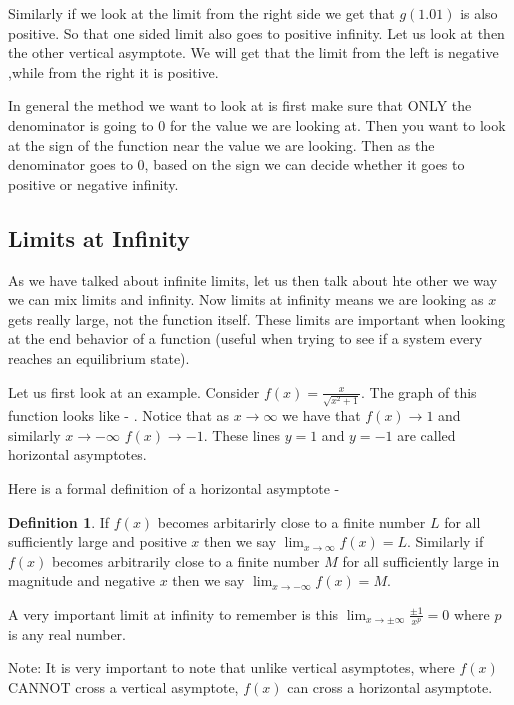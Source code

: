 \documentclass[12pt,reqno]{article}
\theoremstyle{definition}
\newtheorem*{Definition}{Definition}
\begin{document}
	Similarly if we look at the limit from the right side we get that $g(1.01)$ is also positive. So that one sided limit also goes to positive infinity. Let us look at then the other vertical asymptote. We will get that the limit from the left is negative ,while from the right it is positive. 
	
	In general the method we want to look at is first make sure that ONLY the denominator is going to 0 for the value we are looking at. Then you want to look at the sign of the function near the value we are looking. Then as the denominator goes to 0, based on the sign we can decide whether it goes to positive or negative infinity. 
	\subsection{Limits at Infinity}
	
	As we have talked about infinite limits, let us then talk about hte other we way we can mix limits and infinity. Now limits at infinity means we are looking as $x$ gets really large, not the function itself. These limits are important when looking at the end behavior of a function (useful when trying to see if a system every reaches an equilibrium state). 
	
	
	Let us first look at an example. Consider $f(x) = \frac{x}{\sqrt{x^2 + 1}}$. The graph of this function looks like - . Notice that as $x \to \infty$ we have that $f(x) \to 1$ and similarly $x\to -\infty$ $f(x) \to -1$. These lines $y = 1$ and $y = -1$ are called horizontal asymptotes. 

	Here is a formal definition of a horizontal asymptote - 
	\begin{Definition}
		If $f(x)$ becomes arbitarirly close to a finite number $L$ for all sufficiently large and positive $x$ then we say $\lim_{x \to \infty} f(x) = L$. Similarly if $f(x)$ becomes arbitrarily close to a finite number $M$ for all sufficiently large in magnitude and negative $x$ then we say $\lim_{x \to -\infty} f(x) = M$. 
	\end{Definition}

	A very important limit at infinity to remember is this $\lim_{x \to \pm \infty } \frac{\pm 1}{x^p} = 0$ where $p$ is any real number. 

	Note: It is very important to note that unlike vertical asymptotes, where $f(x)$ CANNOT cross a vertical asymptote, $f(x)$ can cross a horizontal asymptote. 
	
\end{document}
